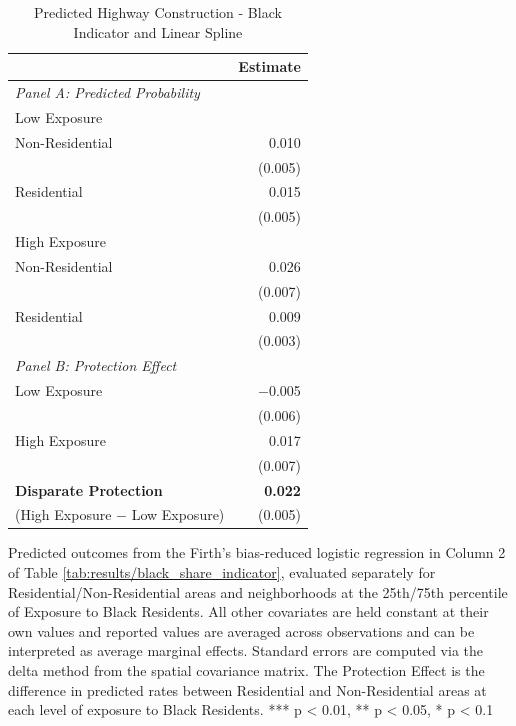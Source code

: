 \begin{table}[h]
\centering
\caption{Predicted Highway Construction - Black Indicator and Linear Spline}
\label{tab:predicted_outcomes/black_share_indicator_logitinteraction}
\begin{threeparttable}
\begin{tabular*}{1\textwidth}{@{\extracolsep{\fill}}lr@{\hspace{1.2em}}}
\toprule
 & Estimate \\
\midrule
\textit{Panel A: Predicted Probability} & \\
\addlinespace[2pt]
Low Exposure & \\
\quad Non-Residential & 0.010 \\
 & (0.005) \\[4pt]
\quad Residential & 0.015 \\
 & (0.005) \\[4pt]
High Exposure & \\
\quad Non-Residential & 0.026 \\
 & (0.007) \\[4pt]
\quad Residential & 0.009 \\
 & (0.003) \\[4pt]
\midrule
\textit{Panel B: Protection Effect} & \\
\addlinespace[2pt]
Low Exposure & $-$0.005 \\
 & (0.006) \\[4pt]
High Exposure & 0.017\rlap{$^{**}$} \\
 & (0.007) \\[4pt]
\addlinespace[2pt]
\textbf{Disparate Protection} & \textbf{0.022}\rlap{$^{***}$} \\
(High Exposure $-$ Low Exposure) & (0.005) \\
\bottomrule
\end{tabular*}
\begin{tablenotes}[flushleft]
\footnotesize
\item Predicted outcomes from the Firth's bias-reduced logistic regression in Column 2 of Table \ref{tab:results/black_share_indicator}, evaluated separately for Residential/Non-Residential areas and neighborhoods at the 25th/75th percentile of Exposure to Black Residents. All other covariates are held constant at their own values and reported values are averaged across observations and can be interpreted as average marginal effects. Standard errors are computed via the delta method from the spatial covariance matrix. The Protection Effect is the difference in predicted rates between Residential and Non-Residential areas at each level of exposure to Black Residents. *** p < 0.01, ** p < 0.05, * p < 0.1
\end{tablenotes}
\end{threeparttable}
\end{table}
